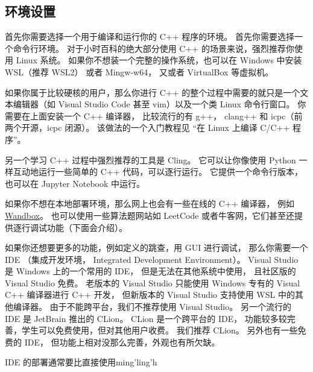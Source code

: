 
\subsection{环境设置}
首先你需要选择一个用于编译和运行你的 C++ 程序的环境。 首先你需要选择一个命令行环境。 对于小时百科的绝大部分使用 C++ 的场景来说，强烈推荐你使用 Linux 系统。 如果你不想装一个完整的操作系统，也可以在 Windows 中安装 WSL（推荐 WSL2） 或者 Mingw-w64， 又或者 VirtualBox 等虚拟机。

如果你属于比较硬核的用户，那么你进行 C++ 的整个过程中需要的就只是一个文本编辑器（如 Visual Studio Code 甚至 vim）以及一个类 Linux 命令行窗口。 你需要在上面安装一个 C++ 编译器， 比较流行的有 g++， clang++ 和 icpc（前两个开源，icpc 闭源）。 该做法的一个入门教程见 “在 Linux 上编译 C/C++ 程序”。

另一个学习 C++ 过程中强烈推荐的工具是 Cling。 它可以让你像使用 Python 一样互动地运行一些简单的 C++ 代码，可以逐行运行。 它提供一个命令行版本，也可以在 Jupyter Notebook 中运行。

如果你不想在本地部署环境，那么网上也会有一些在线的 C++ 编译器， 例如 \href{https://wandbox.org/}{Wandbox}。 也可以使用一些算法题网站如 LeetCode 或者牛客网，它们甚至还提供逐行调试功能（下面会介绍）。

如果你还想要更多的功能，例如定义的跳查，用 GUI 进行调试， 那么你需要一个 IDE （集成开发环境， Integrated Development Environment）。 Visual Studio 是 Windows 上的一个常用的 IDE， 但是无法在其他系统中使用， 且社区版的 Visual Studio 免费。 老版本的 Visual Studio 只能使用 Windows 专有的 Visual C++ 编译器进行 C++ 开发， 但新版本的 Visual Studio 支持使用 WSL 中的其他编译器。 由于不能跨平台，我们不推荐使用 Visual Studio。 另一个流行的 IDE 是 JetBrain 推出的 CLion。 CLion 是一个跨平台的 IDE， 功能较多较完善，学生可以免费使用，但对其他用户收费。 我们推荐 CLion。 另外也有一些免费的 IDE， 但功能上相对没那么完善，外观也有所欠缺。

IDE 的部署通常要比直接使用ming'ling'h
